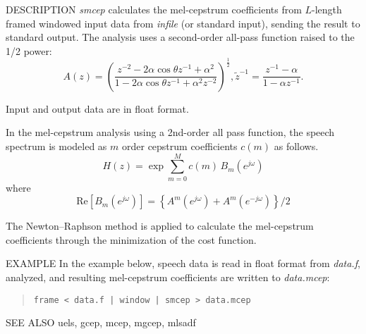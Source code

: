\begin{qsection}{DESCRIPTION}
{\em smcep} calculates the mel-cepstrum coefficients 
from $L$-length framed windowed input data 
from {\em infile} (or standard input), 
sending the result to standard output. 
The analysis uses a second-order all-pass function raised to the 1/2 power: 
\begin{displaymath}
A(z)=
\left(
\frac{z^{-2}-2\alpha \cos \theta z^{-1}+\alpha^2}
	{1-2\alpha \cos \theta z^{-1}+\alpha^2 z^{-2}}
\right)^{\frac{1}{2}}, 
\tilde{z}^{-1} = \frac{z^{-1}-\alpha}{1-\alpha z^{-1}}. 
\end{displaymath}

Input and output data are in float format.

In the mel-cepstrum analysis using
a 2nd-order all pass function,
the speech spectrum is modeled as  $m$ order cepstrum
coefficients $c(m)$ as follows.
\begin{displaymath}
H(z) = \exp \sum_{m=0}^{M} c(m)\,B_m(e^{j\omega})
\end{displaymath}
where
\begin{displaymath}
\mbox{Re}\left[B_m(e^{j\omega})\right]
	=\left\{A^m(e^{j\omega})+A^m(e^{-j\omega})\right\}/2
\end{displaymath}
\par The Newton--Raphson method is applied to calculate
the mel-cepstrum coefficients through the minimization
of the cost function.
\end{qsection}

\newpage
\begin{options}
\end{options}

\begin{qsection}{EXAMPLE}
In the example below, speech data is read in float format
from {\em data.f}, analyzed, and resulting mel-cepstrum
coefficients are written to {\em data.mcep}:
\begin{quote}
 \verb!frame < data.f | window | smcep > data.mcep !
\end{quote}
\end{qsection}

\begin{qsection}{SEE ALSO}
 uels, gcep, mcep, mgcep, mlsadf
\end{qsection}
